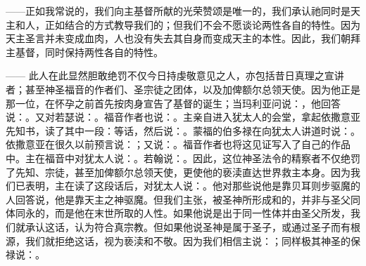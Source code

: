 ——正如我常说的，我们向主基督所献的光荣赞颂是唯一的，我们承认祂同时是天主和人，正如结合的方式教导我们的；但我们不会不愿谈论两性各自的特性。因为天主圣言并未变成血肉，人也没有失去其自身而变成天主的本性。因此，我们朝拜主基督，同时保持两性各自的特性。\par

—— 此人在此显然胆敢绝罚不仅今日持虔敬意见之人，亦包括昔日真理之宣讲者；甚至神圣福音的作者们、圣宗徒之团体，以及加俾额尔总领天使。因为他正是那一位，在怀孕之前首先按肉身宣告了基督的诞生；当玛利亚问说：，他回答说：。又对若瑟说：。福音作者也说：。主亲自进入犹太人的会堂，拿起依撒意亚先知书，读了其中一段：等话，然后说：。蒙福的伯多禄在向犹太人讲道时说：。依撒意亚在很久以前预言说：；又说：。福音作者也将这见证写入了自己的作品中。主在福音中对犹太人说：。若翰说：。因此，这位神圣法令的精察者不仅绝罚了先知、宗徒，甚至加俾额尔总领天使，更使他的亵渎直达世界救主本身。因为我们已表明，主在读了这段话后，对犹太人说：。他对那些说他是靠贝耳则步驱魔的人回答说，他是靠天主之神驱魔。但我们主张，被圣神所形成和的，并非与圣父同体同永的，而是他在末世所取的人性。如果他说是出于同一性体并由圣父所发，我们就承认这话，认为符合真宗教。但如果他说圣神是属于圣子，或通过圣子而有根源，我们就拒绝这话，视为亵渎和不敬。因为我们相信主说：；同样极其神圣的保禄说：。\par

